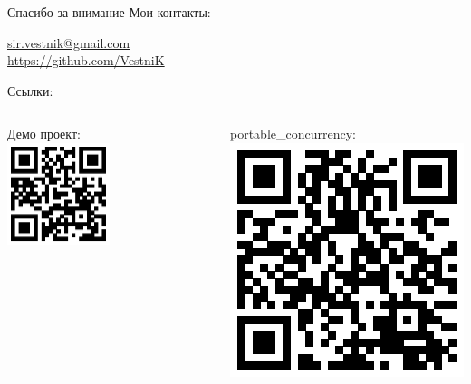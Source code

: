 \documentclass[aspectratio=169,hyperref={unicode},17pt]{beamer}
\begin{document}
\begin{frame}[t]{Спасибо за внимание}
Мои контакты:

{\footnotesize{\url{sir.vestnik@gmail.com}}\\
\footnotesize{\url{https://github.com/VestniK}}}

Ссылки:

\begin{columns}
\begin{column}{0.5\textwidth}

{\footnotesize{Демо проект:}}\\
\includegraphics[width=0.5\textwidth]{demo-qr.eps}
\end{column}
\begin{column}{0.5\textwidth}

{\footnotesize{portable\_concurrency:}}\\
\includegraphics[height=0.5\textwidth]{pc-qr.eps}
\end{column}
\end{columns}
\end{frame}
\end{document}
